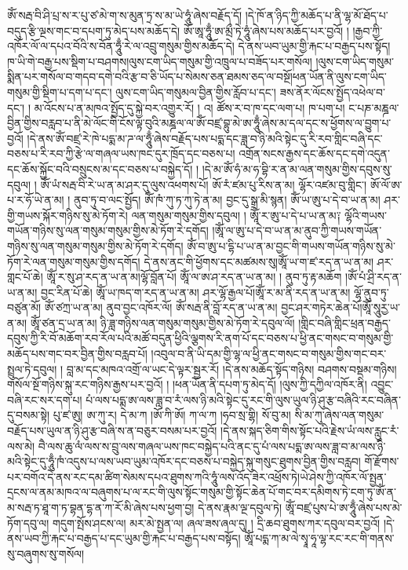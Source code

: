 ཨོཾ་སརྦ་བི་ཤི་པྲ་ས་ར་པུ་ཙ་མེ་ག་ས་མུན་ཏྲ་ས་མ་ཡེ་ཧཱུཾ་ཞེས་བརྗོད་དོ། །དེ་ཁོ་ན་ཉིད་ཀྱི་མཆོད་པ་ནི་ལྷ་མོ་ཐོད་པ་བདུད་རྩི་ལྔས་གང་བ་དཔག་ཏུ་མེད་པས་མཆོད་དེ། ཨོ་ཨཱ་ཧཱུྃ་ཨ་མྲྀ་ཏེ་ཧཱུཾ་ཞེས་པས་མཆོད་པར་བྱའོ། ། །རྒྱབ་ཀྱི་འཁོར་ལོ་ལ་དཔའ་བོའི་ས་བོན་ཧཱུྃ་རེ་ལ་འབྲུ་གསུམ་གྱིས་མཆོད་དེ། དེ་ནས་ཡབ་ཡུམ་གྱི་རྐང་པ་བརྒྱད་པས་སྟོད། ཁ་ཡི་གེ་བརྒྱ་པས་སྡིག་པ་བཤགས།ལུས་ངག་ཡིད་གསུམ་གྱི་འཁྲུལ་པ་བཟོད་པར་གསོལ། །ལུས་ངག་ཡིད་གསུམ་སྨིན་པར་གསོལ་བ་གདབ་དགེ་བའི་རྩ་བ་ཅི་ཡོད་པ་སེམས་ཅན་ཐམས་ཅད་ལ་བསྔོ།ཕན་ཡོན་ནི་ལུས་ངག་ཡིད་གསུམ་གྱི་སྡིག་པ་དག་པ་དང་། ལུས་ངག་ཡིད་གསུམལ་བྱིན་གྱིས་རློབ་པ་དང་། ཟས་ནོར་ལོངས་སྤྱོད་འཕེལ་བ་དང་། ། མ་འོངས་པ་ན་མཁའ་སྤྱོད་དུ་སྐྱེ་བར་འགྱུར་རོ། ། འ། ཚོས་ར་བ་ཁ་དང་ལག་པ། ཁ་པག་པ། ང་པཎ་མཎྜལ་བྱིན་གྱིས་བརླབ་པ་ནི་མེ་ལོང་གི་ངོས་ལྟ་བུའི་མཎྜལ་ལ་ཨོཾ་བཛྲ་བྷུ་མེ་ཨ་ཧཱུྃ་ཞེས་མ་དལ་དང་ས་ཕྱོགས་ལ་བྱུག་པ་བྱའོ། །དེ་ནས་ཨོཾ་བཛྲ་རེ་ཁེ་པདྨ་མ་ཌ་ལ་ཧཱུྃ་ཞེས་བརྗོད་པས་པདྨ་དང་ཟླ་བ་ཉི་མའི་སྟེང་དུ་རི་རབ་གླིང་བཞི་དང་བཅས་པ་རི་རབ་ཀྱི་རྩེ་ལ་གཞལ་ཡས་ཁང་དུར་ཁྲོད་དང་བཅས་པ། འགྲོན་སངས་རྒྱས་དང་ཆོས་དང་དགེ་འདུན་དང་ཆོས་སྐྱོང་བའི་བསྲུངས་མ་དང་བཅས་པ་བསྐྱེད་དོ། ། །དེ་མ་ཨོཾ་ཧཾ་མ་ཧ་བྷི་ར་ན་མ་ལན་གསུམ་གྱིས་དབུས་སུ་དབུལ། ། ཨོཾ་ཡཾ་སརྦ་བི་རེ་ཡ་ན་མ་ཤར་དུ་ལུས་འཕགས་པོ། ཨོ་རཾ་ཛམ་པུ་རིས་ན་མ། ལྷོར་འཛམ་བུ་གླིང་། ཨོ་ལོ་ཨ་པ་ར་ཧོ་ཡེ་ན་མ། ། ནུབ་ཏུ་བ་ལང་སྤྱོད།  ཨོཾ་ཁཾ་ཀུ་ཏ་ཀུ་ཏེ་ན་མ། བྱང་དུ་སྒྲ་མི་སྙན། ཨོཾ་ཡ་ཨུ་པ་དེ་བ་ཡ་ན་མ། ཤར་གྱི་གཡས་སྐོར་གཉིས་སུ་མེ་ཏོག་རེ། ལན་གསུམ་གསུམ་གྱིས་དབུལ། ། ཨཱོཾ་ར་ཨུ་པ་དེ་པ་ཡ་ན་མ༑ ལྷོའི་གཡས་གཡོན་གཉིས་སུ་ལན་གསུམ་གསུམ་གྱིས་མེ་ཏོག་རེ་དགོད། །ཨཱོཾ་ལ་ཨུ་པ་དེ་བ་ཡ་ན་མ་ནུབ་ཀྱི་གཡས་གཡོན་གཉིས་སུ་ལན་གསུམ་གསུམ་གྱིས་མེ་ཏོག་རེ་དགོད། ཨོཾ་བ་ཨུ་པ་དྷི་པ་ཡ་ན་མ་བྱང་གི་གཡས་གཡོན་གཉིས་སུ་མེ་ཏོག་རེ་ལན་གསུམ་གསུམ་གྱིས་དགོད། དེ་ནས་ནང་གི་ཕྱོགས་དང་མཚམས་སུ།ཨཱོཾ་ཡ་ག་ཛ་རད་ན་ཡ་ན་མ། ཤར་གླང་པོ་ཆེ། ཨཱོཾ་ར་སུ་ཤ་རད་ན་ཡ་ན་མ།ལྷོ་བློན་པོ། ཨཱོཾ་ལ་ཨ་ཤ་རད་ན་ཡ་ན་མ། ། ནུབ་ཏུ་རྟ་མཆོག །ཨོཾ་པཾ་ཤྲི་རད་ན་ཡ་ན་མ། བྱང་རིན་པོ་ཆེ། ཨཱོཾ་ཡ་ཁད་ག་རད་ན་ཡ་ན་མ། ཤར་ལྷོ་རྒྱལ་པོ།ཨཱོཾ་ར་མ་ནི་རད་ན་ཡ་ན་མ། ལྷོ་ནུབ་ཏུ་བཙུན་མོ། ཨོཾ་ཙཀྲ་ཡ་ན་མ། ནུབ་བྱང་འཁོར་ལོ། ཨོཾ་སརྦ་ནི་བློ་རད་ན་ཡ་ན་མ། བྱང་ཤར་གཏེར་ཆེན་པོ།ཨཱོཾ་སཱུརྱ་ཡ་ན་མ། ཨཱོཾ་ཙན་དྲ་ཡ་ན་མ། ཉི་ཟླ་གཉིས་ལན་གསུམ་གསུམ་གྱིས་མེ་ཏོག་རེ་དབུལ་ལོ། །གླིང་བཞི་གླིང་ཕྲན་བརྒྱད་དབུས་ཀྱི་རི་བོ་མཆོག་རབ་རོལ་པའི་མཚོ་བདུན་ཕྱིའི་ལྕགས་རི་ནག་པོ་དང་བཅས་པ་ཕྱི་ནང་གསང་བ་གསུམ་གྱི་མཆོད་པས་གང་བར་བྱིན་གྱིས་བརླབ་པོ། །འབུལ་བ་ནི་ཡི་དམ་གྱི་ལྷ་ལ་ཕྱི་ནང་གསང་བ་གསུམ་གྱིས་གང་བར་སྤྲུལ་ཏེ་དབུལ། ། བླ་མ་དང་མཁའ་འགྲོ་ལ་ཡང་དེ་ལྟར་སྦྱར་རོ། །དེ་ནས་མཆོད་སྟོད་གཉིས། བཤགས་བསྡམ་གཉིས། གསོལ་སྔོ་གཉིས་སྐུ་རང་གཉིས་རྒྱས་པར་བྱའོ། ། །ཕན་ཡོན་ནི་དཔག་ཏུ་མེད་དོ། །ལུས་ཀྱི་དཀྱིལ་འཁོར་ནི། འབྱུང་བཞི་རང་སར་དག་པ། པཾ་ལས་པདྨ་ཨ་ལས་ཟླ་བ་རཾ་ལས་ཉི་མའི་སྟེང་དུ་རང་གི་ལུས་ཡུལ་ཉི་ཤུ་རྩ་བཞིའི་རང་བཞིན་དུ་བསམ་སྟེ། པུ་ཛ་ཨུ། ཨ་ཀུ་ར། དེ་མ་ཀ །ཨོ་ཀི་ཨོ། ཀ་ལ་ཀ །ཧབ་སྲ་གྷི། སོ་བུ་མ། སི་མ་ཀུ་ཞེས་ལན་གསུམ་བརྗོད་པས་ཡུལ་ན་ཉི་ཤུ་རྩ་བཞི་ས་ན་བཅུར་བསམ་པར་བྱའོ། །དེ་ནས་སྐད་ཅིག་གིས་སྟོང་པའི་རྗེས་ཡཾ་ལས་རླུང་རཾ་ལས་མེ། བཻ་ལས་ཆུ་ལཾ་ལས་ས་བྲུ་ལས་གཞལ་ཡས་ཁང་བསྐྱེད་པའི་ནང་དུ་པཾ་ལས་པདྨ་ཨ་ལས་ཟླ་བ་མ་ལས་ཉི་མའི་སྟེང་དུ་ཧཱུྃ་ཁཾ་འདུས་པ་ལས་ཡབ་ཡུམ་འཁོར་དང་བཅས་པ་བསྐྱེད་སྐུ་གསུང་ཐུགས་བྱིན་གྱིས་བརླབ། གོ་རྫོགས་པར་བགོའ་དེ་ནས་རང་དམ་ཚིག་སེམས་དཔའ་ཐུགས་ཀའི་ཧཱུཾ་ལས་འོད་ཟེར་འཕྲོས་ཏེ།ཡེ་ཤེས་ཀྱི་འཁོར་ལོ་སྤྱན་དྲངས་ལ་ནམ་མཁའ་ལ་བཞུགས་པ་ལ་རང་གི་ལུས་སྟོང་གསུམ་གྱི་སྟོང་ཆེན་པོ་གང་བར་དམིགས་ཏེ་ངག་ཏུ་ཨོཾ་ན་མ་སརྦ་ཏ་ཐཱ་ག་ཏ་བྷན་དྷ་ན་ཀ་རོ་མི་ཞེས་པས་ཕྱག་བྱ། དེ་ནས་རྣམ་ལྔ་དབུལ་ཏེ། ཨཱོཾ་བཛྲ་པུས་པེ་ཨ་ཧཱུྃ་ཞེས་པས་མེ་ཏོག་དབུ་ལ། གདུག་སྤོས་ཤངས་ལ། མར་མེ་སྤྱན་ལ། ཞལ་ཟས་ཞལ་དུ། ། དྲི་ཆབ་ཐུགས་ཀར་དབུལ་བར་བྱའོ། །དེ་ནས་ཡབ་ཀྱི་རྐང་པ་བརྒྱད་པ་དང་ཡུམ་གྱི་རྐང་པ་བརྒྱད་པས་བསྟོད། ཨཱོཾ་པདྨ་ཀ་མ་ལེ་སྭཱ་ཧཱ་ལྷ་རང་རང་གི་གནས་སུ་བཞུགས་སུ་གསོལ། 
